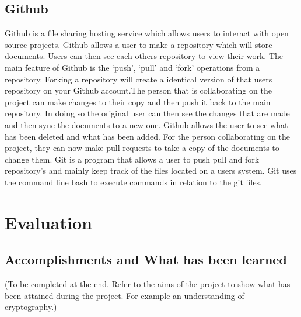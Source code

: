 \documentclass[11pt,a4paper]{report}
\begin{document}
\section{Github}
\label{sec:Git}
Github is a file sharing hosting service which allows users to interact with open source projects. Github allows a user to make a repository which will store documents. Users can then see each others repository to view their work. The main feature of Github is the `push', `pull' and `fork' operations from a repository. Forking a repository will create a identical version of that users repository on your Github account.The person that is collaborating on the project can make changes to their copy and then push it back to the main repository. In doing so the original user can then see the changes that are made and then sync the documents to a new one. Github allows the user to see what has been deleted and what has been added. For the person collaborating on the project, they can now make pull requests to take a copy of the documents to change them.
Git is a program that allows a user to push pull and fork repository's and mainly keep track of the files located on a users system. Git uses the command line bash to execute commands in relation to the git files.


\chapter{Evaluation}
\label{cha:Eval}

\section{Accomplishments and What has been learned}
(To be completed at the end. Refer to the aims of the project to show what has been attained during the project. For example an understanding of cryptography.)
\end{document}
